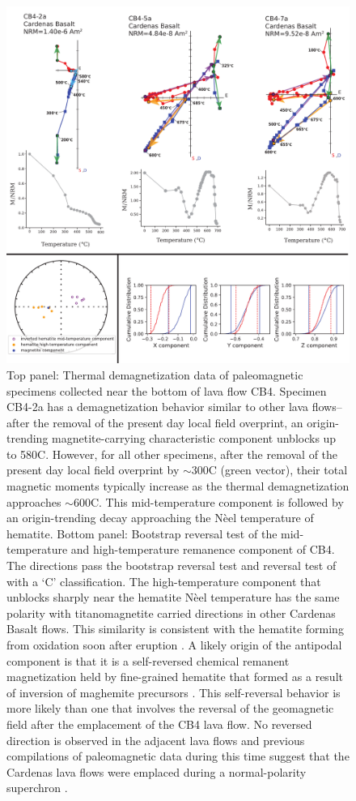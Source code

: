 \documentclass[11pt,letterpaper]{article}
\begin{document}
\begin{figure}[h!]
\noindent\includegraphics[width=5.8 in]{SI_CB4.pdf}
\caption[Paleomagnetic data of Cardenas Basalt lava flow site CB4.]{\footnotesize Top panel: Thermal demagnetization data of paleomagnetic specimens collected near the bottom of lava flow CB4. Specimen CB4-2a has a demagnetization behavior similar to other lava flows--after the removal of the present day local field overprint, an origin-trending magnetite-carrying characteristic component unblocks up to 580\textdegree C. However, for all other specimens, after the removal of the present day local field overprint by $\sim$300\textdegree C (green vector), their total magnetic moments typically increase as the thermal demagnetization approaches $\sim$600\textdegree C. This mid-temperature component is followed by an origin-trending decay approaching the N\`eel temperature of hematite. Bottom panel: Bootstrap reversal test \citep{Tauxe1991a} of the mid-temperature and high-temperature remanence component of CB4. The directions pass the bootstrap reversal test and \cite{McFadden1990a} reversal test of  with a `C' classification. The high-temperature component that unblocks sharply near the hematite N\`eel temperature has the same polarity with titanomagnetite carried directions in other Cardenas Basalt flows. This similarity is consistent with the hematite forming from oxidation soon after eruption \citep{Haggerty1967a}. A likely origin of the antipodal component is that it is a self-reversed chemical remanent magnetization held by fine-grained hematite that formed as a result of inversion of maghemite precursors \citep{Hedley1968a, McClelland1987a, McClelland1993a, Swanson-Hysell2011a}. This self-reversal behavior is more likely than one that involves the reversal of the geomagnetic field after the emplacement of the CB4 lava flow. No reversed direction is observed in the adjacent lava flows and previous compilations of paleomagnetic data during this time suggest that the Cardenas lava flows were emplaced during a normal-polarity superchron \citep{Swanson-Hysell2019a, Driscoll2016b}.}

\end{figure}
\end{document}
